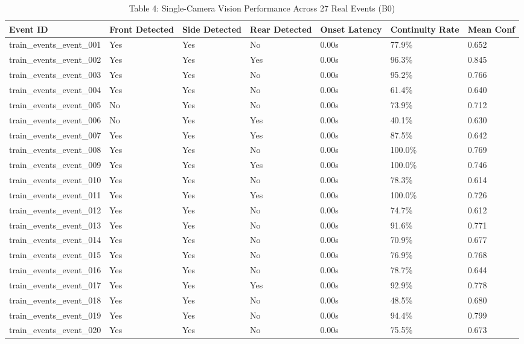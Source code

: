 \begin{table}[t]
\centering
\caption{Table 4: Single-Camera Vision Performance Across 27 Real Events (B0)}
\label{tab:table04_vision_layerb_performance}
\begin{tabular}{lllllll}
\hline
Event ID & Front Detected & Side Detected & Rear Detected & Onset Latency & Continuity Rate & Mean Conf \\
\hline
train\_events\_event\_001 & Yes & Yes & No & 0.00s & 77.9\% & 0.652 \\
train\_events\_event\_002 & Yes & Yes & Yes & 0.00s & 96.3\% & 0.845 \\
train\_events\_event\_003 & Yes & Yes & No & 0.00s & 95.2\% & 0.766 \\
train\_events\_event\_004 & Yes & Yes & No & 0.00s & 61.4\% & 0.640 \\
train\_events\_event\_005 & No & Yes & No & 0.00s & 73.9\% & 0.712 \\
train\_events\_event\_006 & No & Yes & Yes & 0.00s & 40.1\% & 0.630 \\
train\_events\_event\_007 & Yes & Yes & Yes & 0.00s & 87.5\% & 0.642 \\
train\_events\_event\_008 & Yes & Yes & No & 0.00s & 100.0\% & 0.769 \\
train\_events\_event\_009 & Yes & Yes & Yes & 0.00s & 100.0\% & 0.746 \\
train\_events\_event\_010 & Yes & Yes & No & 0.00s & 78.3\% & 0.614 \\
train\_events\_event\_011 & Yes & Yes & Yes & 0.00s & 100.0\% & 0.726 \\
train\_events\_event\_012 & Yes & Yes & No & 0.00s & 74.7\% & 0.612 \\
train\_events\_event\_013 & Yes & Yes & No & 0.00s & 91.6\% & 0.771 \\
train\_events\_event\_014 & Yes & Yes & No & 0.00s & 70.9\% & 0.677 \\
train\_events\_event\_015 & Yes & Yes & No & 0.00s & 76.9\% & 0.768 \\
train\_events\_event\_016 & Yes & Yes & No & 0.00s & 78.7\% & 0.644 \\
train\_events\_event\_017 & Yes & Yes & Yes & 0.00s & 92.9\% & 0.778 \\
train\_events\_event\_018 & Yes & Yes & No & 0.00s & 48.5\% & 0.680 \\
train\_events\_event\_019 & Yes & Yes & No & 0.00s & 94.4\% & 0.799 \\
train\_events\_event\_020 & Yes & Yes & No & 0.00s & 75.5\% & 0.673 \\

\end{tabular}
\end{table}
